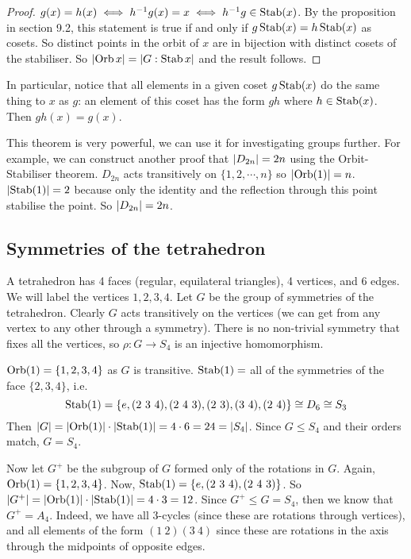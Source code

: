 \begin{proof}
	\(g(x) = h(x) \iff h^{-1}g(x) = x \iff h^{-1}g \in \operatorname{Stab}(x)\).
	By the proposition in section 9.2, this statement is true if and only if
	\(g \operatorname{Stab}(x) = h \operatorname{Stab}(x)\) as cosets.
	So distinct points in the orbit of \(x\) are in bijection with distinct cosets of the stabiliser.
	So \(\abs{\operatorname{Orb} x} = \abs{G : \operatorname{Stab} x}\) and the result follows.
\end{proof}
In particular, notice that all elements in a given coset \(g \operatorname{Stab}(x)\) do the same thing to \(x\) as \(g\): an element of this coset has the form \(gh\) where \(h \in \operatorname{Stab}(x)\).
Then \(gh(x) = g(x)\).

This theorem is very powerful, we can use it for investigating groups further.
For example, we can construct another proof that \(\abs{D_{2n}} = 2n\) using the Orbit-Stabiliser theorem.
\(D_{2n}\) acts transitively on \(\{1, 2, \cdots, n\}\) so \(\abs{\operatorname{Orb}(1)} = n\).
\(\abs{\operatorname{Stab}(1)} = 2\) because only the identity and the reflection through this point stabilise the point.
So \(\abs{D_{2n}} = 2n\).

\subsection{Symmetries of the tetrahedron}
A tetrahedron has 4 faces (regular, equilateral triangles), 4 vertices, and 6 edges.
We will label the vertices \(1, 2, 3, 4\).
Let \(G\) be the group of symmetries of the tetrahedron.
Clearly \(G\) acts transitively on the vertices (we can get from any vertex to any other through a symmetry).
There is no non-trivial symmetry that fixes all the vertices, so \(\rho\colon G \to S_4\) is an injective homomorphism.

\(\operatorname{Orb}(1) = \{ 1, 2, 3, 4 \}\) as \(G\) is transitive.
\(\operatorname{Stab}(1) =\) all of the symmetries of the face \(\{2,3,4\}\), i.e.
\[
	\operatorname{Stab}(1) = \{ e, (2\ 3\ 4), (2\ 4\ 3), (2\ 3), (3\ 4), (2\ 4) \} \cong D_6 \cong S_3
\]
Then \(\abs{G} = \abs{\operatorname{Orb}(1)} \cdot \abs{\operatorname{Stab}(1)} = 4 \cdot 6 = 24 = \abs{S_4}\).
Since \(G \leq S_4\) and their orders match, \(G = S_4\).

Now let \(G^+\) be the subgroup of \(G\) formed only of the rotations in \(G\).
Again, \(\operatorname{Orb}(1) = \{ 1, 2, 3, 4 \}\).
Now, \(\operatorname{Stab}(1) = \{ e, (2\ 3\ 4), (2\ 4\ 3) \}\).
So \(\abs{G^+} = \abs{\operatorname{Orb}(1)} \cdot \abs{\operatorname{Stab}(1)} = 4 \cdot 3 = 12\).
Since \(G^+ \leq G = S_4\), then we know that \(G^+ = A_4\).
Indeed, we have all 3-cycles (since these are rotations through vertices), and all elements of the form \((1\ 2)(3\ 4)\) since these are rotations in the axis through the midpoints of opposite edges.

